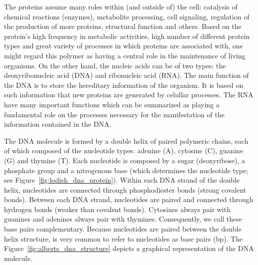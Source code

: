 The proteins assume many roles within (and outside of) the cell: catalysis of chemical reactions (enzymes), metabolite processing, cell signaling, regulation of the production of more proteins, structural function and others. Based on the protein's high frequency in metabolic activities, high number of different protein types and great variety of processes in which proteins are associated with, one might regard this polymer as having a central role in the maintenance of living organisms. On the other hand, the nucleic acids can be of two types: the deoxyribonucleic acid (DNA) and ribonucleic acid (RNA). The main function of the DNA is to store the hereditary information of the organism. It is based on such information that new proteins are generated by celullar processes. The RNA have many important functions which can be summarized as playing a fundamental role on the processes necessary for the manifestation of the information contained in the DNA.

The DNA molecule is formed by a double helix of paired polymeric chains, each of which composed of the nucleotide types: adenine (A), cytosine (C), guanine (G) and thymine (T). Each nucleotide is composed by a sugar (deoxyribose), a phosphate group and a nitrogenous base (which determines the nucleotide type; see Figure~\ref{fig:lodish_dna_protein}). Within each DNA strand of the double helix, nucleotides are connected through phosphodiester bonds (strong covalent bonds). Between each DNA strand, nucleotides are paired and connected through hydrogen bonds (weaker than covalent bonds). Cytosines always pair with guanines and adenines always pair with thymines. Consequently, we call these base pairs complementary. Because nucleotides are paired between the double helix structure, is very common to refer to nucleotides as base pairs (bp). The Figure~\ref{fig:alberts_dna_structure} depicts a graphical representation of the DNA molecule.

